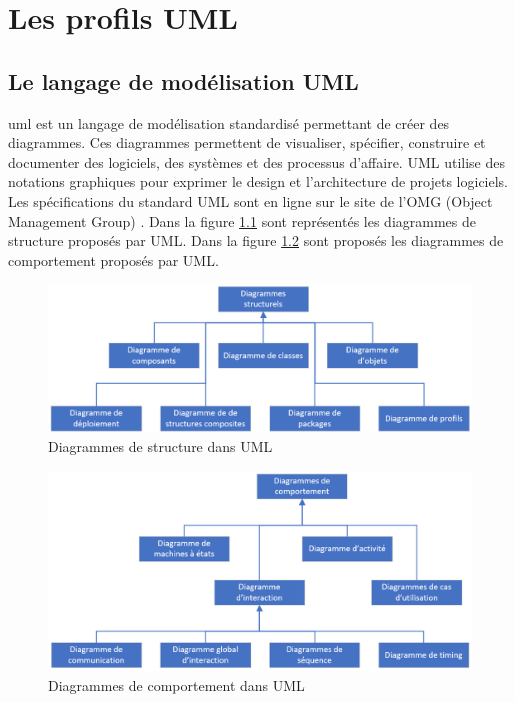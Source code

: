 \chapter{Les profils UML}

\section{Le langage de modélisation UML}
\gls{uml} est un langage de modélisation standardisé permettant de créer des diagrammes.
Ces diagrammes permettent de visualiser, spécifier, construire et documenter des logiciels, des systèmes et des processus d'affaire.
UML utilise des notations graphiques pour exprimer le design et l'architecture de projets logiciels.
Les spécifications du standard UML sont en ligne sur le site de l'OMG (Object Management Group)  \cite{OMG_UML}.
Dans la figure \ref{fig.uml_struc} sont représentés les diagrammes de structure proposés par UML.
Dans la figure \ref{fig.uml_comp} sont proposés les diagrammes de comportement proposés par UML.

\begin{figure}[H]
    \centering
    \includegraphics[width=12cm]{10_img/chap4/structure.PNG} 
    \caption{Diagrammes de structure dans UML \cite{OMG_UML}}
    \label{fig.uml_struc}
\end{figure}

\begin{figure}[H]
    \centering
    \includegraphics[width=12cm]{10_img/chap4/comportement.PNG} 
    \caption{Diagrammes de comportement dans UML \cite{OMG_UML}}
    \label{fig.uml_comp}
\end{figure}

